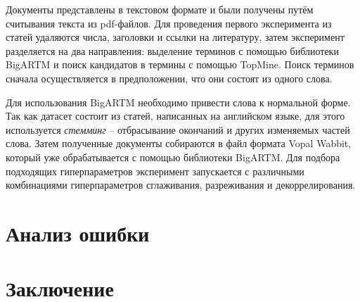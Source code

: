\documentclass[a4paper, 12pt]{article}
\begin{document}
    Документы представлены в текстовом формате и были получены путём считывания текста из pdf-файлов. Для проведения первого эксперимента из статей удаляются числа, заголовки и ссылки на литературу, затем эксперимент разделяется на два направления: выделение терминов с помощью библиотеки BigARTM и поиск кандидатов в термины с помощью TopMine. Поиск терминов сначала осуществляется в предположении, что они состоят из одного слова.

    Для использования BigARTM необходимо привести слова к нормальной форме. Так как датасет состоит из статей, написанных на английском языке, для этого используется \textit{стемминг} -- отбрасывание окончаний и других изменяемых частей слова. Затем полученные документы собираются в файл формата Vopal Wabbit, который уже обрабатывается с помощью библиотеки BigARTM. Для подбора подходящих гиперпараметров эксперимент запускается с различными комбинациями гиперпараметров сглаживания, разреживания и декоррелирования.

\section{Анализ ошибки}

\section{Заключение}



\end{document}
